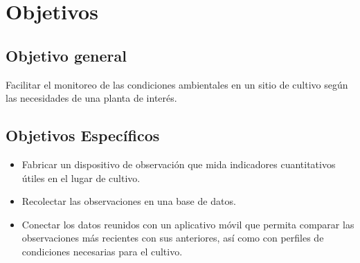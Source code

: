 \documentclass[../main]{subfiles}
\begin{document}
\section{Objetivos}

\subsection{Objetivo general}

Facilitar el monitoreo de las condiciones ambientales en un sitio de cultivo
según las necesidades de una planta de interés.

\subsection{Objetivos Específicos}

\begin{itemize}
	\item Fabricar un dispositivo de observación que mida indicadores cuantitativos
	      útiles en el lugar de cultivo.
	\item Recolectar las observaciones en una base de datos.
	\item Conectar los datos reunidos con un aplicativo móvil que permita comparar
	      las observaciones más recientes con sus anteriores, así como con
	      perfiles de condiciones necesarias para el cultivo.
\end{itemize}
\end{document}
